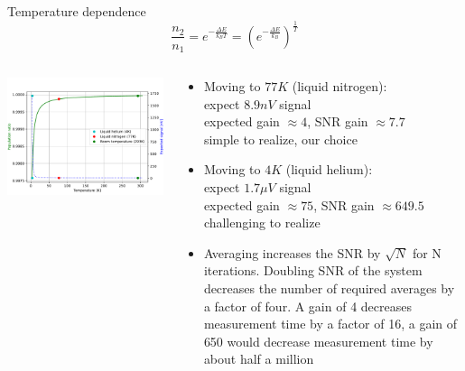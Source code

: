 \documentclass[final]{beamer}
\begin{document}
\begin{frame}[fragile]{}
\begin{columns}[T]
\begin{column}{.49\linewidth}
\begin{block}{\large Temperature dependence}
        $$\frac{n_2}{n_1} = e^{-\frac{\Delta E}{k_B T}} = \left(e^{- \frac{\Delta E}{k_B}}\right)^\frac{1}{T}$$

        \begin{columns}
          \begin{column}{0.4\columnwidth}
            \includegraphics[width=\columnwidth]{figures/tempn2n1.pdf}
          \end{column}
          \begin{column}{0.6\columnwidth}
            \begin{itemize}
              \item Moving to $77K$ (liquid nitrogen): \\ expect $8.9nV$ signal \\ expected gain $\approx 4$, SNR gain $\approx 7.7$ \\ simple to realize, our choice
              \item Moving to $4K$ (liquid helium): \\ expect $1.7\mu V$ signal \\ expected gain $\approx 75$, SNR gain $\approx 649.5$ \\ challenging to realize
              \item Averaging increases the SNR by $\sqrt{N}$ for N iterations. Doubling SNR of the system decreases the number of required averages by a factor of four. A gain of 4 decreases measurement time by a factor of 16,
              a gain of 650 would decrease measurement time by about half a million
            \end{itemize}
          \end{column}
        \end{columns}
      \end{block}


\end{column}
\end{columns}
\end{frame}
\end{document}
